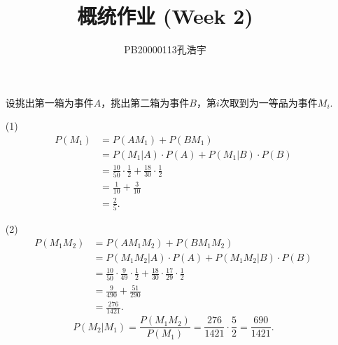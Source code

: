 \documentclass{article}
\title{概统作业 (Week 2)}
\author{PB20000113孔浩宇}
\begin{document}
\maketitle
\section{}  %
\begin{enumerate}
    \item []设挑出第一箱为事件$A$，挑出第二箱为事件$B$，第$i$次取到为一等品为事件$M_i$.
    \item [(1)]
    \begin{align*}
        P(M_1) 
        & =
        P(A M_1) + P(B M_1)\\
        & =
        P(M_1 | A) \cdot P(A) + P(M_1 | B) \cdot P(B)\\
        & =
        \frac{10}{50}\cdot \frac{1}{2} + \frac{18}{30}\cdot \frac{1}{2}\\
        & =
        \frac{1}{10} + \frac{3}{10}\\
        & =
        \frac{2}{5}.
    \end{align*}
    \item [(2)]
    \begin{align*}
        P(M_1 M_2) 
        & =
        P(A M_1 M_2 ) + P(B M_1 M_2)\\
        & =
        P(M_1 M_2 | A) \cdot P(A) + P(M_1 M_2 | B) \cdot P(B)\\
        & =
        \frac{10}{50}\cdot \frac{9}{49} \cdot \frac{1}{2} + \frac{18}{30}\cdot \frac{17}{29} \cdot \frac{1}{2}\\
        & =
        \frac{9}{490} + \frac{51}{290}\\
        & =
        \frac{276}{1421}.
    \end{align*}
    \[
        P(M_2 | M_1)
        =
        \displaystyle{\frac{P(M_1 M_2)}{P(M_1)}}
        =
        \displaystyle{\frac{276}{1421} \cdot \frac{5}{2}}
        =
        \displaystyle{\frac{690}{1421}}.
    \]
\end{enumerate}
\end{document}
